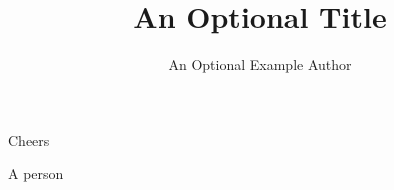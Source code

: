 \documentclass{dragonfly-letter}
\title{An Optional Title}
\author{An Optional Example Author}
\begin{document}
\lipsum[1-7]

Cheers

A person
\end{document}
